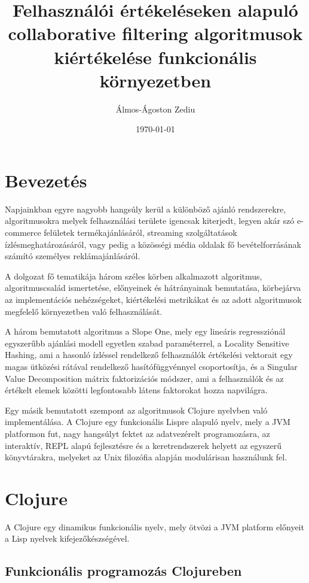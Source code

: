 \documentclass[final, 12pt] {ubb_dolgozat}{book}
\author{Álmos-Ágoston Zediu}
\date{\today}
\title{Felhasználói értékeléseken alapuló collaborative filtering algoritmusok kiértékelése funkcionális környezetben}
\begin{document}
\maketitle
\tableofcontents


\chapter{Bevezetés}
\label{sec:orgc1e576f}
Napjainkban egyre nagyobb hangsúly kerül a különböző ajánló rendszerekre, algoritmusokra melyek felhasználási területe
igencsak kiterjedt, legyen akár szó e-commerce felületek termékajánlásáról, streaming szolgáltatások ízlésmeghatározásáról,
vagy pedig a közösségi média oldalak fő bevételforrásának számító személyes reklámajánlásáról.

A dolgozat fő tematikája három széles körben alkalmazott algoritmus, algoritmuscsalád ismertetése, előnyeinek és hátrányainak
bemutatása, körbejárva az implementációs nehézségeket, kiértékelési metrikákat és az adott algoritmusok megfelelő környezetben
való felhasználását.

A három bemutatott algoritmus a Slope One, mely egy lineáris regressziónál egyszerűbb ajánlási modell egyetlen
szabad paraméterrel, a Locality Sensitive Hashing, ami a hasonló ízléssel rendelkező felhasználók értékelési vektorait egy magas ütközési
rátával rendelkező hasítófüggvénnyel csoportosítja, és a Singular Value Decomposition mátrix faktorizációs módszer, ami a felhasználók
és az értékelt elemek közötti legfontosabb látens faktorokat hozza napvilágra.

Egy másik bemutatott szempont az algoritmusok Clojure nyelvben való implementálása.  A Clojure egy funkcionális Lispre alapuló nyelv, mely a JVM
platformon fut, nagy hangsúlyt fektet az adatvezérelt programozásra, az interaktív, REPL alapú fejlesztésre és a keretrendszerek helyett
az egyszerű könyvtárakra, melyeket az Unix filozófia alapján modulárisan használunk fel.

\chapter{Clojure}
\label{sec:orga0d34c2}
A Clojure egy dinamikus funkcionális nyelv, mely ötvözi a JVM platform előnyeit a Lisp nyelvek
kifejezőkészségével.
\section{Funkcionális programozás Clojureben}
\label{sec:org6cab19c}
\end{document}
